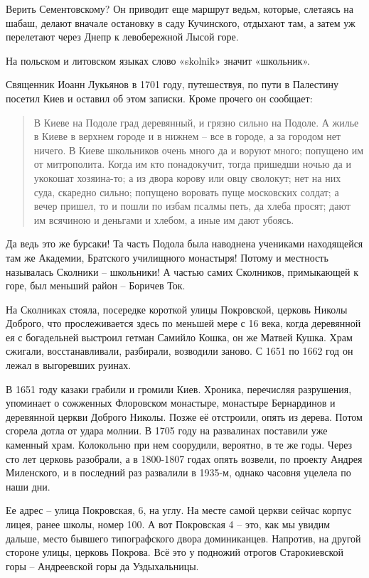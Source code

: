 Верить Сементовскому? Он приводит еще маршрут ведьм, которые, слетаясь на шабаш, делают вначале остановку в саду Кучинского, отдыхают там, а затем уж перелетают через Днепр к левобережной Лысой горе.

На польском и литовском языках слово «skolnik» значит «школьник».

Священник Иоанн Лукьянов в 1701 году, путешествуя, по пути в Палестину посетил Киев и оставил об этом записки\cite{sbornikmat}. Кроме прочего он сообщает:

\begin{quotation}
В Киеве на Подоле град деревянный, и грязно сильно на Подоле. А жилье в Киеве в верхнем городе и в нижнем – все в городе, а за городом нет ничего. В Киеве школьников очень много да и воруют много; попущено им от митрополита. Когда им кто понадокучит, тогда пришедши ночью да и укокошат хозяина-то; а из двора корову или овцу сволокут; нет на них суда, скаредно сильно; попущено воровать пуще московских солдат; а вечер пришел, то и пошли по избам псалмы петь, да хлеба просят; дают им всячиною и деньгами и хлебом, а иные им дают убоясь.
\end{quotation}

Да ведь это же бурсаки! Та часть Подола была наводнена учениками находящейся там же Академии, Братского училищного монастыря! Потому и местность называлась Сколники – школьники! А частью самих Сколников, примыкающей к горе, был меньший район – Боричев Ток.

На Сколниках стояла, посередке короткой улицы Покровской, церковь Николы Доброго, что прослеживается здесь по меньшей мере с 16 века, когда деревянной ея с богадельней выстроил гетман Самийло Кошка, он же Матвей Кушка. Храм сжигали, восстанавливали, разбирали, возводили заново. С 1651 по 1662 год он лежал в выгоревших руинах.

В 1651 году казаки грабили и громили Киев. Хроника, перечисляя разрушения, упоминает о сожженных Флоровском монастыре, монастыре Бернардинов и деревянной церкви Доброго Николы. Позже её отстроили, опять из дерева. Потом сгорела дотла от удара молнии. В 1705 году на развалинах поставили уже каменный храм. Колокольню при нем соорудили, вероятно, в те же годы. Через сто лет церковь разобрали, а в 1800-1807 годах опять возвели, по проекту Андрея Миленского, и в последний раз развалили в 1935-м, однако часовня уцелела по наши дни. 

Ее адрес – улица Покровская, 6, на углу. На месте самой церкви сейчас корпус лицея, ранее школы, номер 100. А вот Покровская 4 – это, как мы увидим дальше, место бывшего типографского двора доминиканцев. Напротив, на другой стороне улицы, церковь Покрова. Всё это у подножий отрогов Старокиевской горы – Андреевской горы да Уздыхальницы.

